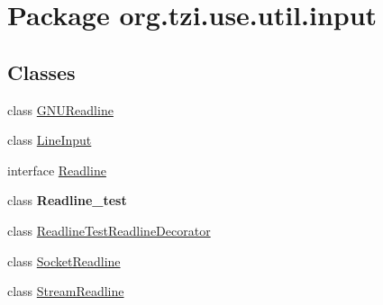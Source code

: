 \hypertarget{namespaceorg_1_1tzi_1_1use_1_1util_1_1input}{\section{Package org.\-tzi.\-use.\-util.\-input}
\label{namespaceorg_1_1tzi_1_1use_1_1util_1_1input}
}
\subsection*{Classes}
\begin{DoxyCompactItemize}
\item 
class \hyperlink{classorg_1_1tzi_1_1use_1_1util_1_1input_1_1_g_n_u_readline}{G\-N\-U\-Readline}
\item 
class \hyperlink{classorg_1_1tzi_1_1use_1_1util_1_1input_1_1_line_input}{Line\-Input}
\item 
interface \hyperlink{interfaceorg_1_1tzi_1_1use_1_1util_1_1input_1_1_readline}{Readline}
\item 
class {\bfseries Readline\-\_\-test}
\item 
class \hyperlink{classorg_1_1tzi_1_1use_1_1util_1_1input_1_1_readline_test_readline_decorator}{Readline\-Test\-Readline\-Decorator}
\item 
class \hyperlink{classorg_1_1tzi_1_1use_1_1util_1_1input_1_1_socket_readline}{Socket\-Readline}
\item 
class \hyperlink{classorg_1_1tzi_1_1use_1_1util_1_1input_1_1_stream_readline}{Stream\-Readline}
\end{DoxyCompactItemize}
